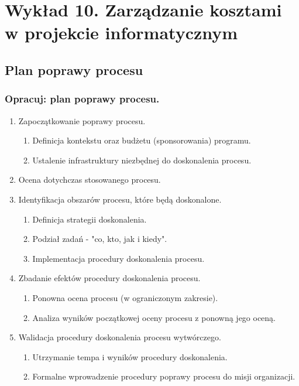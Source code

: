 \chapter{Wykład 10. Zarządzanie kosztami w projekcie informatycznym}

\section{Plan poprawy procesu}

\subsection*{Opracuj: plan poprawy procesu.}

\begin{enumerate}
\item Zapoczątkowanie poprawy procesu.
\begin{enumerate}

\item Definicja kontekstu oraz budżetu (sponsorowania) programu.
\item Ustalenie infrastruktury niezbędnej do doskonalenia procesu.
\end{enumerate}


\item Ocena dotychczas stosowanego procesu.
\item Identyfikacja obszarów procesu, które będą doskonalone.
\begin{enumerate}

\item Definicja strategii doskonalenia.
\item Podział zadań - "co, kto, jak i kiedy".
\item Implementacja procedury doskonalenia procesu.
\end{enumerate}


\item Zbadanie efektów procedury doskonalenia procesu.
\begin{enumerate}

\item Ponowna ocena procesu (w ograniczonym zakresie).
\item Analiza wyników początkowej oceny procesu z ponowną jego oceną.
\end{enumerate}

\item Walidacja procedury doskonalenia procesu wytwórczego.
\begin{enumerate}

\item Utrzymanie tempa i wyników procedury doskonalenia.
\item Formalne wprowadzenie procedury poprawy procesu do misji organizacji.

\end{enumerate}
\end{enumerate}


